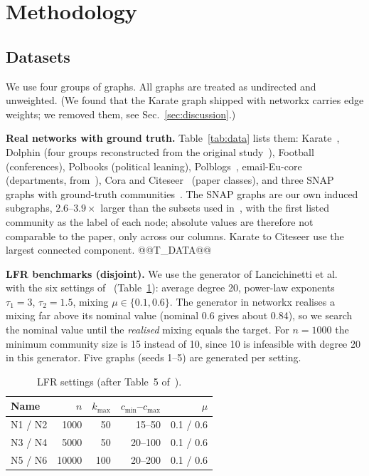 \documentclass[conference]{IEEEtran}
\begin{document}
\section{Methodology}\label{sec:method}
\subsection{Datasets}\label{sec:data}
We use four groups of graphs. All graphs are treated as undirected and unweighted. (We found that the Karate graph shipped with networkx carries edge weights; we removed them, see Sec.~\ref{sec:discussion}.)

\textbf{Real networks with ground truth.} Table~\ref{tab:data} lists them: Karate~\cite{zachary1977}, Dolphin (four groups reconstructed from the original study~\cite{lusseau2003}), Football~\cite{girvan2002} (conferences), Polbooks (political leaning), Polblogs~\cite{adamic2005}, email-Eu-core (departments, from~\cite{yin2017}), Cora and Citeseer~\cite{sen2008} (paper classes), and three SNAP graphs with ground-truth communities~\cite{yang2012}. The SNAP graphs are our own induced subgraphs, $2.6$--$3.9\times$ larger than the subsets used in~\cite{kong2026}, with the first listed community as the label of each node; absolute values are therefore not comparable to the paper, only across our columns. Karate to Citeseer use the largest connected component.
@@T_DATA@@

\textbf{LFR benchmarks (disjoint).} We use the generator of Lancichinetti et al.~\cite{lfr2008} with the six settings of~\cite{kong2026} (Table~\ref{tab:lfrparam}): average degree 20, power-law exponents $\tau_1=3$, $\tau_2=1.5$, mixing $\mu\in\{0.1,0.6\}$. The generator in networkx realises a mixing far above its nominal value (nominal 0.6 gives about 0.84), so we search the nominal value until the \emph{realised} mixing equals the target. For $n=1000$ the minimum community size is 15 instead of 10, since 10 is infeasible with degree 20 in this generator. Five graphs (seeds 1--5) are generated per setting.
\begin{table}[t]
\centering
\caption{LFR settings (after Table~5 of~\cite{kong2026}).}
\label{tab:lfrparam}
\scriptsize
\begin{tabular}{lrrrr}
\toprule
Name & $n$ & $k_{\max}$ & $c_{\min}$--$c_{\max}$ & $\mu$ \\
\midrule
N1 / N2 & 1000 & 50 & 15--50 & 0.1 / 0.6 \\
N3 / N4 & 5000 & 50 & 20--100 & 0.1 / 0.6 \\
N5 / N6 & 10000 & 100 & 20--200 & 0.1 / 0.6 \\
\bottomrule
\end{tabular}
\end{table}
\end{document}

